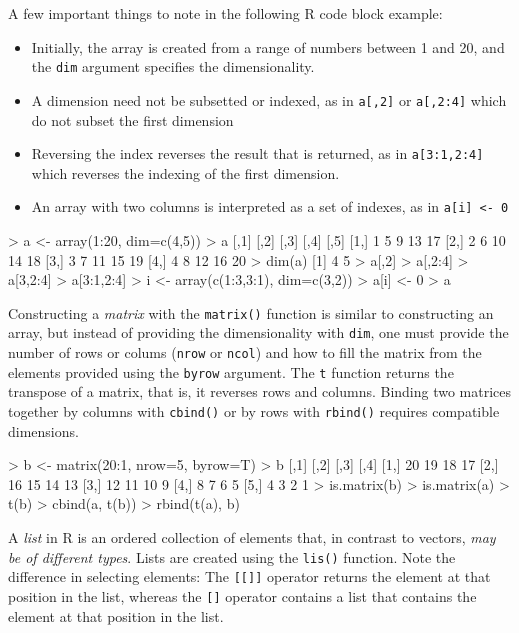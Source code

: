 A few important things to note in the following R code block example:
\begin{itemize}
   \item Initially, the array is created from a range of numbers between 1 and 20, and the \texttt{dim} argument specifies the dimensionality. 
   \item A dimension need not be subsetted or indexed, as in \texttt{a[,2]} or \texttt{a[,2:4]} which do not subset the first dimension
   \item Reversing the index reverses the result that is returned, as in \texttt{a[3:1,2:4]} which reverses the indexing of the first dimension. 
   \item An array with two columns is interpreted as a set of indexes, as in \texttt{a[i] <- 0}
\end{itemize}

\begin{samepage}
\begin{Rcode}
> a <- array(1:20, dim=c(4,5))
> a
     [,1] [,2] [,3] [,4] [,5]
[1,]    1    5    9   13   17
[2,]    2    6   10   14   18
[3,]    3    7   11   15   19
[4,]    4    8   12   16   20
> dim(a)
[1] 4 5
> a[,2]
> a[,2:4]
> a[3,2:4]
> a[3:1,2:4]
> i <- array(c(1:3,3:1), dim=c(3,2))
> a[i] <- 0
> a
\end{Rcode}
\end{samepage}

Constructing a \emph{matrix} with the \texttt{matrix()} function is similar to constructing an array, but instead of providing the dimensionality with \texttt{dim}, one must provide the number of rows or colums (\texttt{nrow} or \texttt{ncol}) and how to fill the matrix from the elements provided using the \texttt{byrow} argument. The \texttt{t} function returns the transpose of a matrix, that is, it reverses rows and columns. Binding two matrices together by columns with \texttt{cbind()} or by rows with \texttt{rbind()} requires compatible dimensions.

\begin{samepage}
\begin{Rcode}
> b <- matrix(20:1, nrow=5, byrow=T)
> b
     [,1] [,2] [,3] [,4]
[1,]   20   19   18   17
[2,]   16   15   14   13
[3,]   12   11   10    9
[4,]    8    7    6    5
[5,]    4    3    2    1
> is.matrix(b)
> is.matrix(a)
> t(b)
> cbind(a, t(b))
> rbind(t(a), b)
\end{Rcode}
\end{samepage}

A \emph{list} in R is an ordered collection of elements that, in contrast to vectors, \emph{may be of different types}. Lists are created using the \texttt{lis()} function. Note the difference in selecting elements: The \texttt{[[]]} operator returns the element at that position in the list, whereas the \texttt{[]} operator contains a list that contains the element at that position in the list. 

